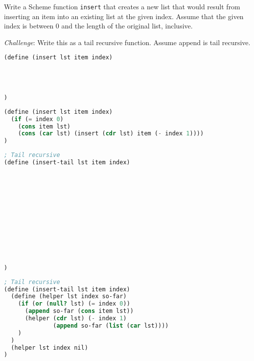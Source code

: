 \begin{blocksection}
\question Write a Scheme function \texttt{insert} that creates a new list that would result from inserting an item into an existing list at the given index.
Assume that the given index is between 0 and the length of the original list, inclusive.

\emph{Challenge}: Write this as a tail recursive function. Assume append is tail recursive.

\begin{lstlisting}[language=Scheme]
(define (insert lst item index)




)
\end{lstlisting}

\begin{solution}[0.5in]
\begin{lstlisting}[language=Scheme]
(define (insert lst item index)
  (if (= index 0)
    (cons item lst)
    (cons (car lst) (insert (cdr lst) item (- index 1))))
)
\end{lstlisting}
\end{solution}

\begin{lstlisting}[language=Scheme]
; Tail recursive
(define (insert-tail lst item index)












)
\end{lstlisting}

\begin{solution}
\begin{lstlisting}[language=Scheme]
; Tail recursive
(define (insert-tail lst item index)
  (define (helper lst index so-far)
    (if (or (null? lst) (= index 0))
      (append so-far (cons item lst))
      (helper (cdr lst) (- index 1)
              (append so-far (list (car lst))))
    )
  )
  (helper lst index nil)
)
\end{lstlisting}
\end{solution}
\end{blocksection}
